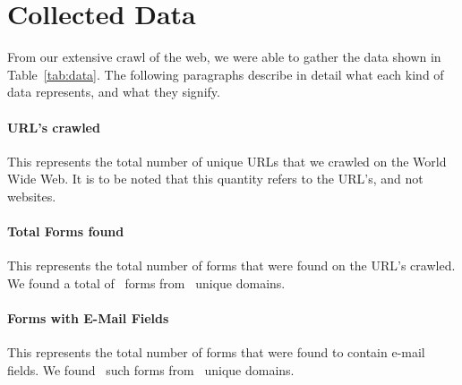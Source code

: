\section{Collected Data}
From our extensive crawl of the web, we were able to gather the data shown in Table~\ref{tab:data}. The following paragraphs describe in detail what each kind of data represents, and what they signify.



\paragraph{URL's crawled}
This represents the total number of unique URLs that we crawled on the World Wide Web. It is to be noted that this quantity refers to the URL's, and not websites.

\paragraph{Total Forms found}
This represents the total number of forms that were found on the URL's crawled. We found a total of \forms\ forms from 
\uniqueforms\ unique domains.

\paragraph{Forms with E-Mail Fields}
This represents the total number of forms that were found to contain e-mail fields. We found \emailforms\ such forms from \uniqueemailforms\ unique domains.

